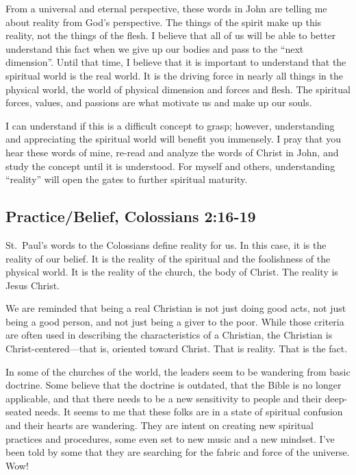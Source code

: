\documentclass[12pt]{memoir}
\begin{document}
From a universal and eternal perspective, these words in John are
telling me about reality from God's perspective. The things
of the spirit make up this reality, not the things of the flesh. I
believe that all of us will be able to better understand this fact
when we give up our bodies and pass to the ``next dimension''. Until
that time, I believe that it is important to understand that the spiritual
world is the real world. It is the driving force in nearly all things
in the physical world, the world of physical dimension and forces
and flesh. The spiritual forces, values, and passions are what motivate
us and make up our souls.

I can understand if this is a difficult concept to grasp; however,
understanding and appreciating the spiritual world will benefit you
immensely. I pray that you hear these words of mine, re-read and analyze
the words of Christ in John, and study the concept until it is understood.
For myself and others, understanding ``reality'' will open the gates
to further spiritual maturity.

\subsection[Practice\slash{}Belief]{Practice\slash{}Belief, Colossians 2:16-19}


St.~Paul's words to the Colossians define reality for us. In
this case, it is the reality of our belief. It is the reality of the spiritual and the foolishness of the physical world. It is
the reality of the church, the body of Christ. The reality is Jesus Christ.

We are reminded that being a real Christian is not just doing good
acts, not just being a good person, and not just being a giver to
the poor. While those criteria are often used in describing the characteristics
of a Christian, the Christian is Christ-centered---that is, oriented toward Christ. That is reality. That is the fact. 

In some of the churches of the world, the leaders seem to be wandering
from basic doctrine. Some believe that the doctrine is outdated, that
the Bible is no longer applicable, and that there needs to be a new
sensitivity to people and their deep-seated needs. It seems
to me that these folks are in a state of spiritual confusion and
their hearts are wandering. They are intent on creating new spiritual
practices and procedures, some even set to new music and a new
mindset. I've been told by some that they are searching for the fabric
and force of the universe. Wow!
\end{document}
